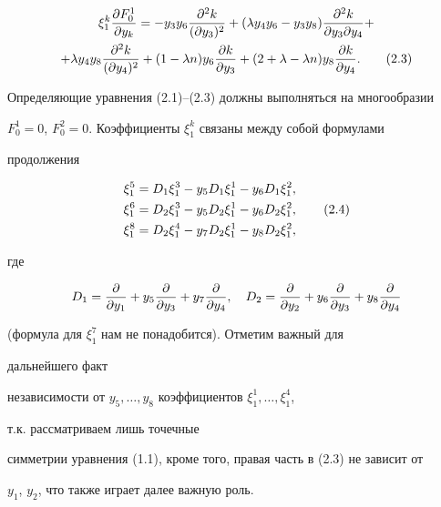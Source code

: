 \begin{multline}


\xi^k_1\frac{\pa F^1_0}{\dy_k}=-y_3y_6


\frac{\pa^2k}{(\dy_3)^2}+(\lambda y_4y_6-y_3y_8)


\frac{\pa^2k}{\dy_3\dy_4}+\\


+\lambda y_4y_8\frac{\pa^2k}{(\dy_4)^2}+


(1-\lambda n)y_6\frac{\pa k}{\dy_3}+(2+\lambda-\lambda n)y_8


\frac{\pa k}{\dy_4}.


\tag{2.3}


\end{multline}


Определяющие уравнения (2.1)--(2.3) должны выполняться на многообразии


$F^1_0=0$, $F^2_0=0$. Коэффициенты $\xi^k_1$ связаны между собой формулами


продолжения \cite{Ovs1}


\begin{align}


\xi^5_1&=D_1\xi^3_1-y_5D_1\xi^1_1-y_6D_1\xi^2_1,\notag \\


\xi^6_1&=D_2\xi^3_1-y_5D_2\xi^1_1-y_6D_2\xi^2_1,\tag{2.4}\\


\xi^8_1&=D_2\xi^4_1-y_7D_2\xi^1_1-y_8D_2\xi^2_1,\notag


\end{align}


где


$$


D_1=\frac{\pa}{\dy_1}+y_5\frac{\pa}{\dy_3}+


y_7\frac{\pa}{\dy_4},\quad


D_2=\frac{\pa}{\dy_2}+y_6\frac{\pa}{\dy_3}+


y_8\frac{\pa}{\dy_4}


$$


(формула для $\xi^7_1$ нам не понадобится). Отметим важный для


дальнейшего факт


независимости от $y_5,\dotsc,y_8$ коэффициентов $\xi^1_1,\dotsc,\xi^4_1$,


т.к. рассматриваем лишь точечные


симметрии уравнения (1.1), кроме того, правая часть в (2.3) не зависит от


$y_1$, $y_2$, что также играет далее важную роль.





